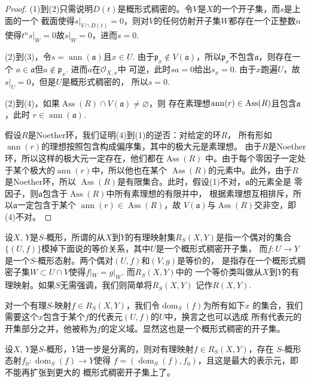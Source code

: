 \begin{proof}
(1)到(2)只需说明$D(t)$是概形式稠密的。令$V$是$X$的一个开子集，而$s$是上面的一个
截面使得$s|_{V\cap D(t)}=0$，则对$V$的任何仿射开子集$W$都存在一个正整数$n$
使得$t^n s|_W=0$故$s|_W=0$，进而$s=0$.

(2)到(3)，令$s=\operatorname{ann}(\mathfrak a)$且$x\in U$. 由于$\mathfrak p_x 
\not \in V(\mathfrak a)$，所以$\mathfrak p_x$不包含$\mathfrak a$，则存在一个
$a\in \mathfrak a$但$a\not\in \mathfrak p_x$. 进而$a$在$\mathcal O_{X,x}$中
可逆，此时$sa=0$给出$s_x=0$. 由于$x$跑遍$U$，故$s|_U=0$，但是$U$是概形式稠密的，
所以$s=0$.

(2)到(4)，如果$\operatorname{Ass}(R)\cap V(\mathfrak a)\neq \varnothing$，则
存在素理想$\operatorname{ann}(r)\in \operatorname{Ass}(R)$且包含$\mathfrak a$，此时
$r\in \operatorname{ann}(\mathfrak a)$.

假设$R$是Noether环，我们证明(4)到(1)的逆否：对给定的环$R$，
所有形如$\operatorname{ann}(r)$的理想按照包含构成偏序集，其中的极大元是素理想。
由于$R$是Noether环，所以这样的极大元一定存在，他们都在$\operatorname{Ass}(R)$
中。由于每个零因子一定处于某个极大的$\operatorname{ann}(r)$中，所以他也在某个
$\operatorname{Ass}(R)$的元素中。此外，由于$R$是Noether环，所以
$\operatorname{Ass}(R)$是有限集合。此时，假设(1)不对，$\mathfrak a$的元素全是
零因子，则$\mathfrak a$包含于$\operatorname{Ass}(R)$中所有素理想的有限并中，
根据素理想互相排斥，所以$\mathfrak a$一定包含于某个
$\operatorname{ann}(r)\in \operatorname{Ass}(R)$，故
$V(\mathfrak a)$与$\operatorname{Ass}(R)$交非空，即(4)不对。
\end{proof}

\begin{para}[有理映射]
设$X$, $Y$是$S$-概形，所谓的从$X$到$Y$的有理映射集$R_S(X,Y)$是指一个偶对的集合
$\{(U,f)\}$模掉下面说的等价关系，其中$U$是一个概形式稠密开子集，
而$f:U\to Y$是一个$S$-概形态射。两个偶对$(U,f)$和$(V,g)$是等价的，
是指存在一个概形式稠密子集$W\subset U\cap V$使得$f|_W=g|_W$. 而$R_S(X,Y)$中的
一个等价类叫做从$X$到$Y$的有理映射。如果$S$无需强调，我们则简单将$R_S(X,Y)$
记作$R(X,Y)$.

对一个有理$S$-映射$f\in R_S(X,Y)$，我们令$\operatorname{dom}_S(f)$为所有如下$x$
的集合，我们需要这个$x$包含于某个$f$的代表元$(U,f)$的$U$中，换言之也可以选成
所有代表元的开集部分之并，他被称为$f$的定义域。显然这也是一个概形式稠密的开子集。
\end{para}

\begin{pro}
	设$X$, $Y$是$S$-概形，$Y$进一步是分离的，则对有理映射$f\in R_S(X,Y)$，存在
	$S$-概形态射$f_0:\operatorname{dom}_S(f)\to Y$使得
	$f=(\operatorname{dom}_S(f),f_0)$，且这是最大的表示元，即不能再扩张到更大的
	概形式稠密开子集上了。
\end{pro}

